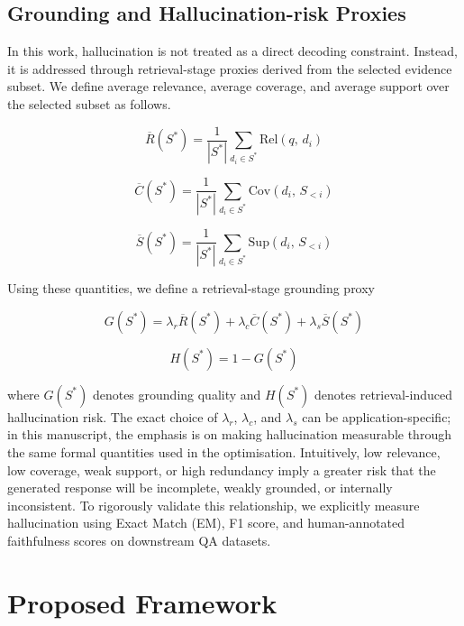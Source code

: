 \documentclass[conference]{IEEEtran}
\begin{document}
\subsection{Grounding and Hallucination-risk Proxies}

In this work, hallucination is not treated as a direct decoding constraint. Instead, it is addressed through retrieval-stage proxies derived from the selected evidence subset. We define average relevance, average coverage, and average support over the selected subset as follows.

\begin{equation}
\overline{R}(S^*) = \frac{1}{|S^*|} \sum_{d_i \in S^*} \mathrm{Rel}(q,\, d_i)
\end{equation}

\begin{equation}
\overline{C}(S^*) = \frac{1}{|S^*|} \sum_{d_i \in S^*} \mathrm{Cov}(d_i,\, S_{<i})
\end{equation}

\begin{equation}
\overline{S}(S^*) = \frac{1}{|S^*|} \sum_{d_i \in S^*} \mathrm{Sup}(d_i,\, S_{<i})
\end{equation}

Using these quantities, we define a retrieval-stage grounding proxy

\begin{equation}
G(S^*) = \lambda_r \overline{R}(S^*) + \lambda_c \overline{C}(S^*) + \lambda_s \overline{S}(S^*)
\end{equation}

\begin{equation}
H(S^*) = 1 - G(S^*)
\end{equation}

where $G(S^*)$ denotes grounding quality and $H(S^*)$ denotes retrieval-induced hallucination risk. The exact choice of $\lambda_r$, $\lambda_c$, and $\lambda_s$ can be application-specific; in this manuscript, the emphasis is on making hallucination measurable through the same formal quantities used in the optimisation. Intuitively, low relevance, low coverage, weak support, or high redundancy imply a greater risk that the generated response will be incomplete, weakly grounded, or internally inconsistent. To rigorously validate this relationship, we explicitly measure hallucination using Exact Match (EM), F1 score, and human-annotated faithfulness scores on downstream QA datasets.

\section{Proposed Framework}
\end{document}
